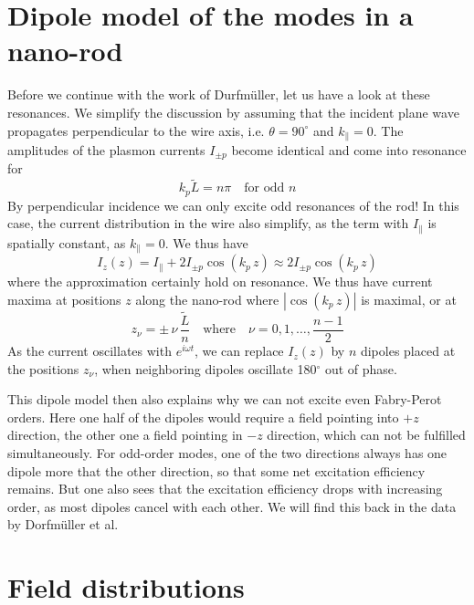 \section{Dipole model of the modes in a nano-rod}

Before we continue with the work of Durfmüller, let us have a look at these resonances. 
We simplify the discussion by assuming that the incident plane wave propagates 
perpendicular to the wire axis, i.e. $\theta = 90^\circ$ and $k_\parallel = 0$. The 
amplitudes of the plasmon currents $I_{\pm p}$ become identical and come into resonance 
for 
\begin{equation}
  k_p \tilde{L} = n \pi \quad \text{for odd } n
\end{equation}
By perpendicular incidence we can only excite odd resonances of the rod! In this case, the current distribution in the wire also simplify, as the term with $I_\parallel$ is spatially constant, as $k_\parallel = 0$. We thus have
\begin{equation}
  I_z(z) = I_\parallel + 2 I_{\pm p} \cos ( k_p \, z) \approx  2 I_{\pm p} \cos ( k_p \, z)
\end{equation}
where the approximation certainly hold on resonance. We thus have current maxima at positions $z$ along the nano-rod where $|\cos ( k_p \, z)|$ is maximal, or at
\begin{equation}
  z_\nu = \pm \,  \nu \, \frac{\tilde{L}}{n} \quad \text{where} \quad \nu = 0, 1, \dots , \frac{n -1}{2}
\end{equation}
As the current oscillates with $e^{i \omega t}$, we can replace $I_z(z)$ by $n$ dipoles placed at the positions $z_\nu$, when neighboring dipoles oscillate 180$^\circ$ out of phase. 

This dipole model then also explains why we can not excite even Fabry-Perot orders. Here one half of the dipoles would require a field pointing into $+z$ direction, the other one a field pointing in $-z$ direction, which can not be fulfilled simultaneously. For odd-order modes, one of the two directions always has one dipole more that the other direction, so that some net excitation efficiency remains. But one also sees that the excitation efficiency drops with increasing order, as most dipoles cancel with each other. We will find this back in the data by Dorfmüller et al.


\section{Field distributions}

